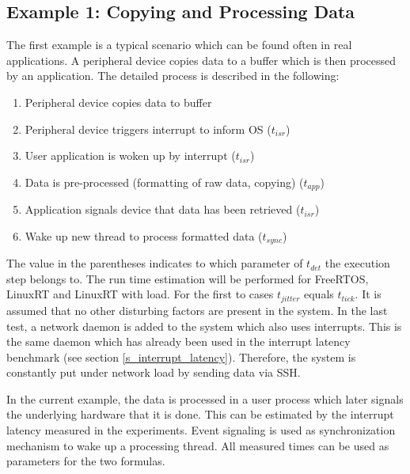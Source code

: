 \subsection{Example 1: Copying and Processing Data}
The first example is a typical scenario which can be found often in real applications. 
A peripheral device copies data to a buffer which is then processed by an application. 
The detailed process is described in the following:
\begin{enumerate}
	\item Peripheral device copies data to buffer
	\item	Peripheral device triggers interrupt to inform OS ($t_{isr}$)
	\item User application is woken up by interrupt ($t_{isr}$)
	\item Data is pre-processed (formatting of raw data, copying) ($t_{app}$)
	\item Application signals device that data has been retrieved ($t_{isr}$)
	\item Wake up new thread to process formatted data ($t_{sync}$)
\end{enumerate}
The value in the parentheses indicates to which parameter of $t_{det}$ the execution step belongs to.
The run time estimation will be performed for FreeRTOS, LinuxRT and LinuxRT with load.
For the first to cases $t_{jitter}$ equals $t_{tick}$.
It is assumed that no other disturbing factors are present in the system.
In the last test, a network daemon is added to the system which also uses interrupts. 
This is the same daemon which has already been used in the interrupt latency benchmark (see section \ref{s_interrupt_latency}). 
Therefore, the system is constantly put under network load by sending data via \ac{SSH}.
\par
In the current example, the data is processed in a user process which later signals the underlying hardware that it is done. 
This can be estimated by the interrupt latency measured in the experiments. 
Event signaling is used as synchronization mechanism to wake up a processing thread.
All measured times can be used as parameters for the two formulas.

